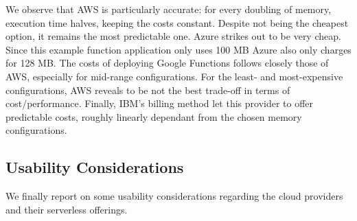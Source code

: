 We observe that \gls{AWS} is particularly accurate: for every doubling of memory, execution time halves, keeping the costs constant.
Despite not being the cheapest option, it remains the most predictable one. 
Azure strikes out to be very cheap. Since this example function application only uses 100 \gls{MB} Azure also only charges for 128 \gls{MB}.   
The costs of deploying Google Functions follows closely those of \gls{AWS}, especially for mid-range configurations.
For the least- and most-expensive configurations, AWS reveals to be not the best trade-off in terms of cost/performance.
Finally, IBM's billing method let this provider to offer predictable costs, roughly linearly dependant from the chosen memory configurations.

\subsection{Usability Considerations}
We finally report on some usability considerations regarding the cloud providers and their serverless offerings.

